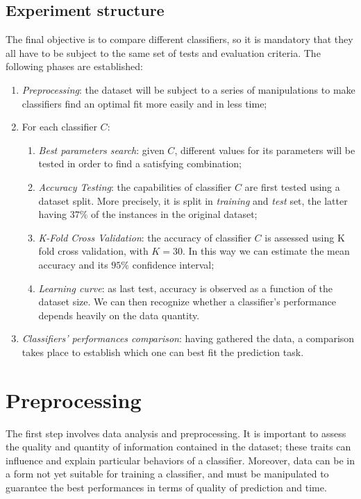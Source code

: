 \documentclass[a4paper, 10pt]{article}
\begin{document}
\subsection{Experiment structure}
The final objective is to compare different classifiers, so it is mandatory that they all have to be subject to the same set of tests and evaluation criteria. The following phases are established:
\begin{enumerate}
 \item \emph{Preprocessing}: the dataset will be subject to a series of manipulations to make classifiers find an optimal fit more easily and in less time;
 \item For each classifier $C$:
 \begin{enumerate}
  
    \item \emph{Best parameters search}: given $C$, different values for its parameters will be tested in order to find a satisfying combination;
    \item \emph{Accuracy Testing}: the capabilities of classifier $C$ are first tested using a dataset split. More precisely, it is split in \emph{training} and \emph{test} set, the latter having $37\%$ of the instances in the original dataset;
    \item \emph{K-Fold Cross Validation}: the accuracy of classifier $C$ is assessed using K fold cross validation, with $K = 30$. In this way we can estimate the mean accuracy and its $95\%$ confidence interval;
    \item \emph{Learning curve}: as last test, accuracy is observed as a function of the dataset size. We can then recognize whether a classifier's performance depends heavily on the data quantity.
  \end{enumerate}
 \item \emph{Classifiers' performances comparison}: having gathered the data, a comparison takes place to establish which one can best fit the prediction task.
\end{enumerate}


\section{Preprocessing}
The first step involves data analysis and preprocessing. It is important to assess the quality and quantity of information contained in the dataset; these traits can influence and explain particular behaviors of a classifier. Moreover, data can be in a form not yet suitable for training a classifier, and must be manipulated to guarantee the best performances in terms of quality of prediction and time.
\end{document}
